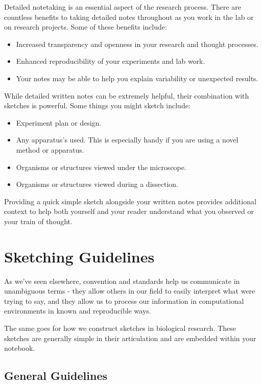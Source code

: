 \documentclass[
]{book}
\providecommand{\tightlist}{%
  \setlength{\itemsep}{0pt}\setlength{\parskip}{0pt}}
\begin{document}
Detailed notetaking is an essential aspect of the research process. There are countless benefits to taking detailed notes throughout as you work in the lab or on research projects. Some of these benefits include:

\begin{itemize}
\tightlist
\item
  Increased transparency and openness in your research and thought processes.
\item
  Enhanced reproducibility of your experiments and lab work.
\item
  Your notes may be able to help you explain variability or unexpected results.
\end{itemize}

While detailed written notes can be extremely helpful, their combination with sketches is powerful. Some things you might sketch include:

\begin{itemize}
\tightlist
\item
  Experiment plan or design.
\item
  Any apparatus's used. This is especially handy if you are using a novel method or apparatus.
\item
  Organisms or structures viewed under the microscope.
\item
  Organisms or structures viewed during a dissection.
\end{itemize}

Providing a quick simple sketch alongside your written notes provides additional context to help both yourself and your reader understand what you observed or your train of thought.

\section{Sketching Guidelines}\label{sketching-guidelines}

As we've seen elsewhere, convention and standards help us communicate in unambiguous terms - they allow others in our field to easily interpret what we\textquotesingle re trying to say, and they allow us to process our information in computational environments in known and reproducible ways.

The same goes for how we construct sketches in biological research. These sketches are generally simple in their articulation and are embedded within your notebook.

\subsection*{General Guidelines}\label{general-guidelines}
\end{document}
